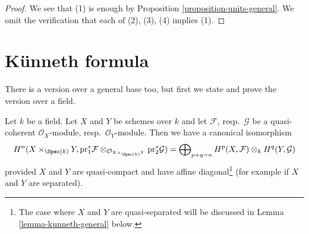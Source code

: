 \begin{proof}
We see that (1) is enough by
Proposition \ref{proposition-units-general}.
We omit the verification that each of (2), (3), (4) implies (1).
\end{proof}







\section{K\"unneth formula}
\label{section-kunneth}

\noindent
There is a version over a general base too, but first we state
and prove the version over a field.

\begin{lemma}
\label{lemma-kunneth}
Let $k$ be a field. Let $X$ and $Y$ be schemes over $k$ and
let $\mathcal{F}$, resp.\ $\mathcal{G}$ be a quasi-coherent
$\mathcal{O}_X$-module, resp.\ $\mathcal{O}_Y$-module.
Then we have a canonical isomorphism
$$
H^n(X \times_{\Spec(k)} Y, \text{pr}_1^*\mathcal{F}
\otimes_{\mathcal{O}_{X \times_{\Spec(k)} Y}} \text{pr}_2^*\mathcal{G}) =
\bigoplus\nolimits_{p + q = n}
H^p(X, \mathcal{F}) \otimes_k H^q(Y, \mathcal{G})
$$
provided $X$ and $Y$ are quasi-compact and have affine
diagonal\footnote{The case where $X$ and $Y$ are quasi-separated
will be discussed in Lemma \ref{lemma-kunneth-general} below.}
(for example if $X$ and $Y$ are separated).
\end{lemma}

